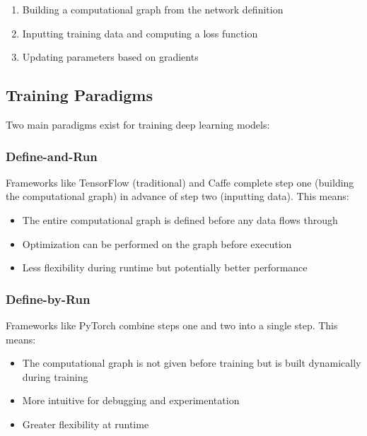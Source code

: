 \documentclass[
  letterpaper,
  DIV=11,
  numbers=noendperiod]{scrreprt}
\providecommand{\tightlist}{%
  \setlength{\itemsep}{0pt}\setlength{\parskip}{0pt}}\usepackage{longtable,booktabs,array}
\begin{document}
\begin{enumerate}
\def\labelenumi{\arabic{enumi}.}
\tightlist
\item
  Building a computational graph from the network definition
\item
  Inputting training data and computing a loss function
\item
  Updating parameters based on gradients
\end{enumerate}

\subsection{Training Paradigms}\label{training-paradigms}

Two main paradigms exist for training deep learning models:

\subsubsection{Define-and-Run}\label{define-and-run}

Frameworks like TensorFlow (traditional) and Caffe complete step one
(building the computational graph) in advance of step two (inputting
data). This means:

\begin{itemize}
\tightlist
\item
  The entire computational graph is defined before any data flows
  through
\item
  Optimization can be performed on the graph before execution
\item
  Less flexibility during runtime but potentially better performance
\end{itemize}

\subsubsection{Define-by-Run}\label{define-by-run}

Frameworks like PyTorch combine steps one and two into a single step.
This means:

\begin{itemize}
\tightlist
\item
  The computational graph is not given before training but is built
  dynamically during training
\item
  More intuitive for debugging and experimentation
\item
  Greater flexibility at runtime
\end{itemize}
\end{document}
